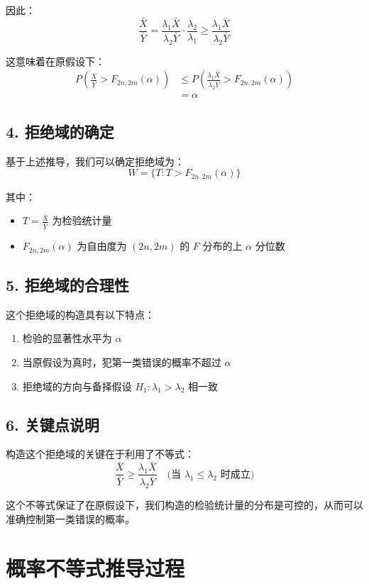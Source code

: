 \documentclass[UTF8]{report}
\theoremstyle{MyLineTheoremStyle} %
\theoremstyle{MyBlockTheoremStyle} %
\theoremstyle{MySubsubsectionStyle} %
\begin{document}
因此：
\[ \frac{\bar{X}}{\bar{Y}} = \frac{\lambda_1\bar{X}}{\lambda_2\bar{Y}} \cdot \frac{\lambda_2}{\lambda_1} \geqslant \frac{\lambda_1\bar{X}}{\lambda_2\bar{Y}} \]

这意味着在原假设下：
\begin{align*}
P(\frac{\bar{X}}{\bar{Y}} > F_{2n,2m}(\alpha)) &\leqslant P(\frac{\lambda_1\bar{X}}{\lambda_2\bar{Y}} > F_{2n,2m}(\alpha)) \\
&= \alpha
\end{align*}

\subsection*{4. 拒绝域的确定}
基于上述推导，我们可以确定拒绝域为：
\[ W = \{T: T > F_{2n,2m}(\alpha)\} \]

其中：
\begin{itemize}
    \item $T = \frac{\bar{X}}{\bar{Y}}$ 为检验统计量
    \item $F_{2n,2m}(\alpha)$ 为自由度为 $(2n,2m)$ 的 $F$ 分布的上 $\alpha$ 分位数
\end{itemize}

\subsection*{5. 拒绝域的合理性}
这个拒绝域的构造具有以下特点：
\begin{enumerate}
    \item 检验的显著性水平为 $\alpha$
    \item 当原假设为真时，犯第一类错误的概率不超过 $\alpha$
    \item 拒绝域的方向与备择假设 $H_1: \lambda_1 > \lambda_2$ 相一致
\end{enumerate}

\subsection*{6. 关键点说明}
构造这个拒绝域的关键在于利用了不等式：
\[ \frac{\bar{X}}{\bar{Y}} \geqslant \frac{\lambda_1\bar{X}}{\lambda_2\bar{Y}} \quad \text{(当 } \lambda_1 \leqslant \lambda_2 \text{ 时成立)} \]

这个不等式保证了在原假设下，我们构造的检验统计量的分布是可控的，从而可以准确控制第一类错误的概率。

\section*{概率不等式推导过程}
\end{document}
